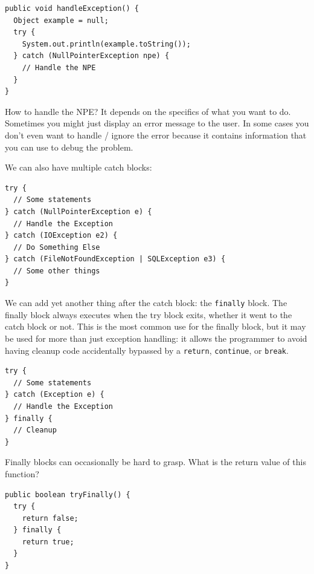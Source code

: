 \begin{verbatim}
public void handleException() {
  Object example = null;
  try {
    System.out.println(example.toString());
  } catch (NullPointerException npe) {
    // Handle the NPE
  }
}
\end{verbatim}

How to handle the NPE? It depends on the specifics of what you want to do. Sometimes you might just display an error message to the user. In some cases you don't even want to handle / ignore the error because it contains information that you can use to debug the problem. 

We can also have multiple catch blocks:

\begin{verbatim}
try {
  // Some statements   
} catch (NullPointerException e) {
  // Handle the Exception
} catch (IOException e2) {
  // Do Something Else
} catch (FileNotFoundException | SQLException e3) {
  // Some other things
}
\end{verbatim}

We can add yet another thing after the catch block: the \texttt{finally} block. The finally block always executes when the try block exits, whether it went to the catch block or not. This is the most common use for the finally block, but it may be used for more than just exception handling: it allows the programmer to avoid having cleanup code accidentally bypassed by a \texttt{return}, \texttt{continue}, or \texttt{break}.

\begin{verbatim}
try {
  // Some statements   
} catch (Exception e) {
  // Handle the Exception
} finally {
  // Cleanup
}
\end{verbatim}

Finally blocks can occasionally be hard to grasp. What is the return value of this function?

\begin{verbatim}
public boolean tryFinally() {
  try {
    return false;
  } finally {
    return true;
  }
}
\end{verbatim}

